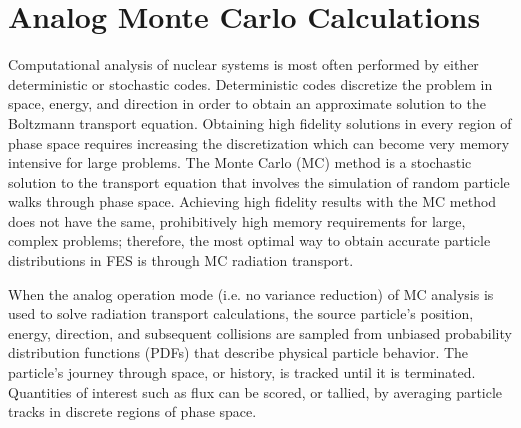


\section{Analog Monte Carlo Calculations} \label{sec:analog_mc}
Computational analysis of nuclear systems is most often performed by either
deterministic or stochastic codes.  Deterministic codes discretize the problem
in space, energy, and direction in order to obtain an approximate solution to
the Boltzmann transport equation.  Obtaining high fidelity solutions in every
region of phase space requires increasing the discretization which can
become very memory intensive for large problems. 
The Monte Carlo (MC) method is a stochastic solution to the transport equation \cite{l_m}
that involves the simulation of random particle
walks through phase space.  Achieving high fidelity results with the MC method
does not have the same, prohibitively high memory requirements for large,
complex problems; therefore,
the most optimal way to 
obtain accurate particle distributions in FES is through MC radiation transport.


When the analog operation mode (i.e. no variance reduction) of MC analysis is 
used to solve radiation transport calculations, 
the source particle's position, energy, direction,
and subsequent collisions are sampled from unbiased probability
distribution functions (PDFs) that describe physical particle behavior.
The particle's journey through space, or history, is tracked until it is
terminated.
Quantities of interest such as flux can be
scored, or tallied, by averaging particle tracks
in discrete regions of phase space.

